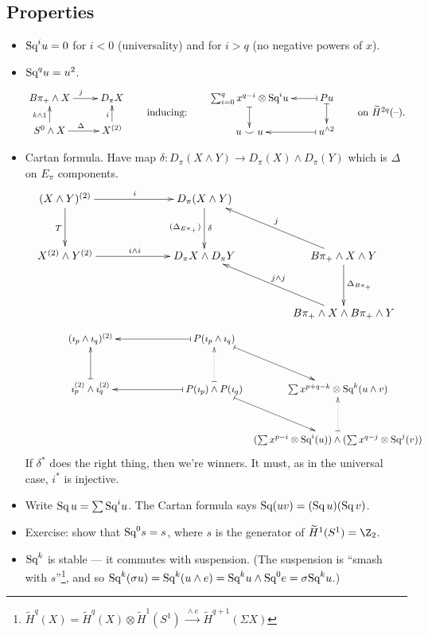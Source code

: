 \documentclass[11pt]{article}
\begin{document}
\begin{SteenrodTalk}
\subsection*{Properties}
\begin{itemize}
\item $\textup{Sq}^i u=0$ for $i<0$ (universality) and for $i>q$ (no negative powers of $x$).
\item $\textup{Sq}^q u=u^2$.
\[\xymatrix@R=.6cm{
B\pi_+ \wedge X \ar[r]^j & D_\pi X \\
S^0 \wedge X  \ar[r]^\Delta\ar[u]^{k\wedge 1} & X^{(2)}\ar[u]^i
}
\raisebox{-.5cm}{\textup{\qquad inducing:\qquad}}
\xymatrix@R=.6cm{
\sum_{i=0}^q x^{q-i} \otimes \Squ^i u\ar@{|->}[d]&
\ar@{|->}[l]  Pu \ar@{|->}[d]\\
u\smile u & u^{\wedge2}\ar@{|->}[l]
}\raisebox{-.5cm}{\textup{\qquad on $\widetilde H^{2q}(\DASH)$.\qquad}}
\]
\item Cartan formula. Have map $\delta:D_\pi(X\wedge Y)\to D_\pi(X)\wedge D_\pi(Y)$ which is $\Delta$ on $E_\pi$ components.
\[\xymatrix@!0@C=4.4cm@R=1.8cm{
(X\wedge Y)^{(2)}\ar[r]^i\ar[d]_T&D_\pi(X\wedge Y)\ar[d]^{\delta}_{(\Delta_{E\pi_+})}\\
X^{(2)}\wedge Y^{(2)}\ar[r]^{i\wedge i}&D_\pi X\wedge D_\pi Y
&B\pi_+\wedge X\wedge Y\ar[ul]_j\ar[d]^{\Delta_{B\pi_+}}\\
&&B\pi_+\wedge X\wedge B\pi_+\wedge Y\ar[ul]_{j\wedge j}
}\]
\[\qquad\qquad\xymatrix@!0@C=4.4cm@R=1.8cm{
(\imath_p\wedge \imath_q)^{(2)}&
\ar@{|->}[l]  P(\imath_p\wedge\imath_q)\ar@{|->}[dr]\\
\imath_p^{(2)}\wedge \imath_q^{(2)} \ar@{|->}[u]& P(\imath_p)\wedge P(\imath_q)\ar@{|->}[l]\ar@{|..>}[u]
&\sum x^{p+q-k}\otimes\Squ^k(u\wedge v)\\
&&(\sum x^{p-i}\otimes\Squ^i(u))\wedge(\sum x^{q-j}\otimes\Squ^j(v))\ar@{|..>}[u]\ar@{|->}[ul];[]
}\]
If $\delta^*$ does the right thing, then we're winners. It must, as in the universal case, $i^*$ is injective.
\item Write $\textup{Sq}\,u=\sum \textup{Sq}^iu$. The Cartan formula says $\textup{Sq}(uv)=(\textup{Sq}\,u)(\textup{Sq}\,v)$.
\item Exercise: show that $\textup{Sq}^0 s = s$, where $s$ is the generator of $\widetilde H^1 (S^1) = \Z_2$.
\item $\textup{Sq}^k$ is stable --- it commutes with suspension. (The suspension is ``smash with $s$''\footnote{$\widetilde H^q (X)=\widetilde H^q (X)\otimes\widetilde H^1(S^1)\xrightarrow{\ \wedge e\ }\widetilde H^{q+1} (\Sigma X)$}, and so $\textup{Sq}^k(\sigma u) = \textup{Sq}^k(u \wedge e) = \textup{Sq}^k u \wedge \textup{Sq}^0 e = \sigma \textup{Sq}^k u$.)

\end{itemize}
\end{SteenrodTalk}
\end{document}
